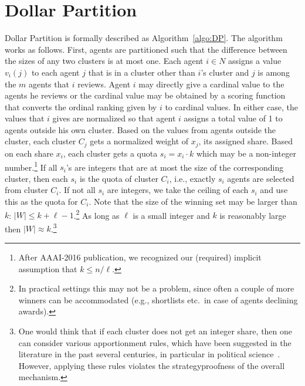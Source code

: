 \documentclass[letterpaper]{article}
\newcommand{\haris}[1]{\textcolor{green}{\textbf{Haris Says: #1}}}
\begin{document}
\section{Dollar Partition}



Dollar Partition is formally described as Algorithm~\ref{algo:DP}. The algorithm works as follows. First, agents are partitioned such that the difference between the sizes of any two clusters is at most one. Each agent $i\in N$ assigns a value $v_i(j)$ to each agent $j$ that is in a cluster other than $i$'s cluster and $j$ is among the $m$ agents that $i$ reviews. Agent $i$ may directly give a cardinal value to the agents he reviews or the cardinal value may be obtained by a scoring function that converts the ordinal ranking given by $i$ to cardinal values. In either case, the values that $i$ gives are normalized so that agent $i$ assigns a total value of 1 to agents outside his own cluster. Based on the values from agents outside the cluster, each cluster $C_j$ gets a normalized weight of $x_j$, its assigned share. Based on each share $x_i$, each cluster gets a quota $s_i=x_i \cdot k$ which may be a non-integer number.\footnote{After AAAI-2016 publication, we recognized our (required) implicit assumption that $k \leq n/\ell$.}
	If all $s_i$'s are integers that are at most the size of the corresponding cluster, then each $s_i$ is the quota of cluster $C_i$, i.e., exactly $s_i$ agents are selected from cluster $C_i$.
If not all $s_i$ are integers, we take the ceiling of each $s_i$ and use this as the quota for $C_i$.
Note that the size of the winning set may be larger than $k$: $|W| \leq k+\ell-1$.\footnote{In practical settings this may not be a problem, since often a couple of more winners can be accommodated (e.g., shortlists etc.\ in case of agents declining awards).}
As long as $\ell$ is a small integer and $k$ is reasonably large then $|W| \approx k$.\footnote{One would think that if each cluster does not get an integer share, then one can consider various apportionment rules, which have been suggested in the literature in the past several centuries, in particular in political science~\cite{Youn94a}. However, applying these rules violates the strategyproofness of the overall mechanism.}
\end{document}
